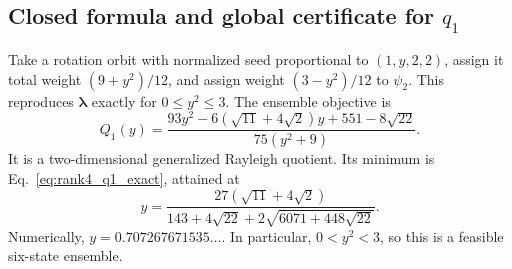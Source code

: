 \documentclass[11pt]{article}
\begin{document}
\subsection{Closed formula and global certificate for $q_1$}
Take a rotation orbit with normalized seed proportional to $(1,y,2,2)$, assign it total weight $(9+y^2)/12$, and assign weight $(3-y^2)/12$ to $\psi_2$. This reproduces $\boldsymbol\lambda$ exactly for $0\le y^2\le3$. The ensemble objective is
\begin{equation}\label{eq:roof_Q1_y}
 Q_1(y)=\frac{93y^2-6(\sqrt{11}+4\sqrt2)y+551-8\sqrt{22}}
 {75(y^2+9)}.
\end{equation}
It is a two-dimensional generalized Rayleigh quotient. Its minimum is Eq.~\eqref{eq:rank4_q1_exact}, attained at
\begin{equation}\label{eq:roof_y_exact}
 y=\frac{27(\sqrt{11}+4\sqrt2)}
 {143+4\sqrt{22}+2\sqrt{6071+448\sqrt{22}}}.
\end{equation}
Numerically, $y=0.707267671535\ldots$. In particular, $0<y^2<3$, so this is a feasible six-state ensemble.
\end{document}
